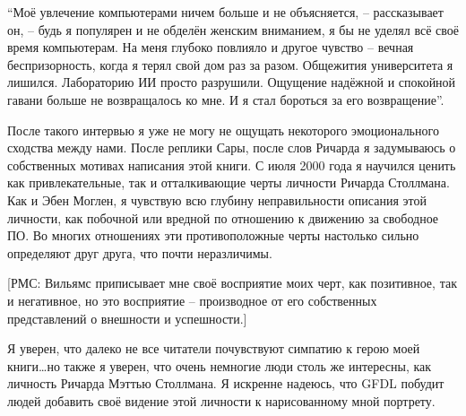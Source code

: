 \enquote{Моё увлечение компьютерами ничем больше и не объясняется, -- рассказывает он, -- будь я популярен и не обделён женским вниманием, я бы не уделял всё своё время компьютерам. На меня глубоко повлияло и другое чувство -- вечная беспризорность, когда я терял свой дом раз за разом. Общежития университета я лишился. Лабораторию ИИ просто разрушили. Ощущение надёжной и спокойной гавани больше не возвращалось ко мне. И я стал бороться за его возвращение}.

После такого интервью я уже не могу не ощущать некоторого эмоционального сходства между нами. После реплики Сары, после слов Ричарда я задумываюсь о собственных мотивах написания этой книги. С июля 2000 года я научился ценить как привлекательные, так и отталкивающие черты личности Ричарда Столлмана. Как и Эбен Моглен, я чувствую всю глубину неправильности описания этой личности, как побочной или вредной по отношению к движению за свободное ПО. Во многих отношениях эти противоположные черты настолько сильно определяют друг друга, что почти неразличимы.

[РМС: Вильямс приписывает мне своё восприятие моих черт, как позитивное, так и негативное, но это восприятие -- производное от его собственных представлений о внешности и успешности.]

Я уверен, что далеко не все читатели почувствуют симпатию к герою моей книги\ldots но также я уверен, что очень немногие люди столь же интересны, как личность Ричарда Мэттью Столлмана. Я искренне надеюсь, что GFDL побудит людей добавить своё видение этой личности к нарисованному мной портрету.

\theendnotes
\setcounter{endnote}{0}
